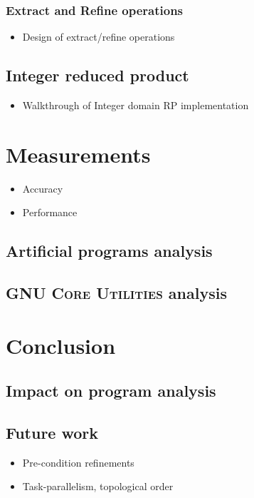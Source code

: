 \documentclass[12pt,oneside]{fithesis2}
\theoremstyle{definition}
\begin{document}
\subsection{Extract and Refine operations}
\begin{itemize}
  \item Design of extract/refine operations
\end{itemize}

\section{Integer reduced product}
\begin{itemize}
  \item Walkthrough of Integer domain RP implementation
\end{itemize}


\chapter{Measurements}
\begin{itemize}
  \item Accuracy
  \item Performance
\end{itemize}
\section{Artificial programs analysis}
\section{\textsc{GNU Core Utilities} analysis}


\chapter{Conclusion}
\section{Impact on program analysis}
\section{Future work}
\begin{itemize}
  \item Pre-condition refinements
  \item Task-parallelism, topological order
\end{itemize}



\end{document}
